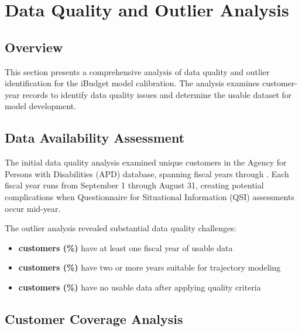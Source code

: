 \section{Data Quality and Outlier Analysis}

\subsection{Overview}

This section presents a comprehensive analysis of data quality and outlier identification for the iBudget model calibration. The analysis examines customer-year records to identify data quality issues and determine the usable dataset for model development.

\subsection{Data Availability Assessment}

The initial data quality analysis examined \TheTotalNumberCustomers{} unique customers in the Agency for Persons with Disabilities (APD) database, spanning fiscal years \TheInitialYear{} through \TheFinalYear{}. Each fiscal year runs from September 1 through August 31, creating potential complications when Questionnaire for Situational Information (QSI) assessments occur mid-year.

The outlier analysis revealed substantial data quality challenges:
\begin{itemize}
    \item \textbf{\CustomerNumberOneYear{} customers (\CustomerPctOneYear\%)} have at least one fiscal year of usable data
    \item \textbf{\CustomerNumberTwoPlusYear{} customers (\CustomerPctTwoPlusYear\%)} have two or more years suitable for trajectory modeling
    \item \textbf{\CustomerNumberNoData{} customers (\CustomerPctNoData\%)} have no usable data after applying quality criteria
\end{itemize}

\subsection{Customer Coverage Analysis}


